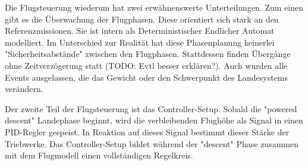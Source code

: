 Die Flugsteuerung wiederum hat zwei erwähnenswerte Unterteilungen. Zum einen gibt es die Überwachung der Flugphasen. Diese orientiert sich stark an den Referenzmissionen. Sie ist intern als Deterministischer Endlicher Automat  modelliert. Im Unterschied zur Realität hat diese Phasenplanung keinerlei "Sicherheitsabstände" zwischen den Flugphasen. Stattdessen finden Übergänge ohne Zeitverzögerung statt (TODO: Evtl besser erklären?). Auch wurden alle Events ausgelassen, die das Gewicht oder den Schwerpunkt des Landesystems verändern.

Der zweite Teil der Flugsteuerung ist das Controller-Setup. Sobald die "powered descent" Landephase beginnt, wird die verbleibenden Flughöhe als Signal in einen PID-Regler gespeist. In Reaktion auf dieses Signal bestimmt dieser Stärke der Triebwerke. Das Controller-Setup bildet während der "descent" Phase zusammen mit dem Flugmodell einen vollständigen Regelkreis.

